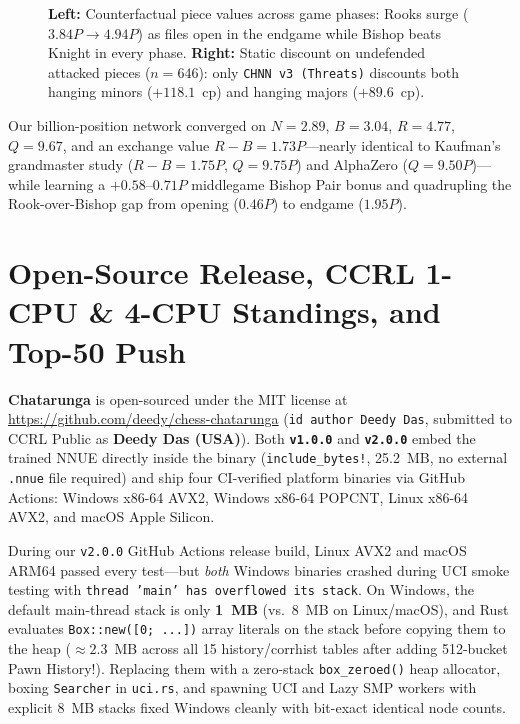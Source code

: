 \documentclass[10.5pt,letterpaper]{article}
\begin{document}
\begin{figure}[H]
\begin{minipage}[c]{0.46\textwidth}
\end{minipage}
\caption{\textbf{Left:} Counterfactual piece values across game phases: Rooks surge ($3.84P\to 4.94P$) as files open in the endgame while Bishop beats Knight in every phase. \textbf{Right:} Static discount on undefended attacked pieces ($n=646$): only \texttt{CHNN v3 (Threats)} discounts both hanging minors ($+118.1$~cp) and hanging majors ($+89.6$~cp).}
\label{fig:pieces_and_threats}
\end{figure}

Our billion-position network converged on $N=2.89$, $B=3.04$, $R=4.77$, $Q=9.67$, and an exchange value $R-B = 1.73P$—nearly identical to Kaufman's grandmaster study ($R-B=1.75P$, $Q=9.75P$) and AlphaZero ($Q=9.50P$)—while learning a $+0.58\text{--}0.71P$ middlegame Bishop Pair bonus and quadrupling the Rook-over-Bishop gap from opening ($0.46P$) to endgame ($1.95P$).

\section{Open-Source Release, CCRL 1-CPU \& 4-CPU Standings, and Top-50 Push}

\textbf{Chatarunga} is open-sourced under the MIT license at \url{https://github.com/deedy/chess-chatarunga} (\texttt{id author Deedy Das}, submitted to CCRL Public as \textbf{Deedy Das (USA)}). Both \textbf{\texttt{v1.0.0}} and \textbf{\texttt{v2.0.0}} embed the trained NNUE directly inside the binary (\texttt{include\_bytes!}, 25.2~MB, no external \texttt{.nnue} file required) and ship four CI-verified platform binaries via GitHub Actions: Windows x86-64 AVX2, Windows x86-64 POPCNT, Linux x86-64 AVX2, and macOS Apple Silicon.

\begin{failurebox}
During our \texttt{v2.0.0} GitHub Actions release build, Linux AVX2 and macOS ARM64 passed every test—but \emph{both} Windows binaries crashed during UCI smoke testing with \texttt{thread 'main' has overflowed its stack}. On Windows, the default main-thread stack is only \textbf{1~MB} (vs.\ 8~MB on Linux/macOS), and Rust evaluates \texttt{Box::new([0; ...])} array literals on the stack before copying them to the heap ($\approx 2.3$~MB across all 15 history/corrhist tables after adding 512-bucket Pawn History!). Replacing them with a zero-stack \texttt{box\_zeroed()} heap allocator, boxing \texttt{Searcher} in \texttt{uci.rs}, and spawning UCI and Lazy SMP workers with explicit 8~MB stacks fixed Windows cleanly with bit-exact identical node counts.
\end{failurebox}
\end{document}
